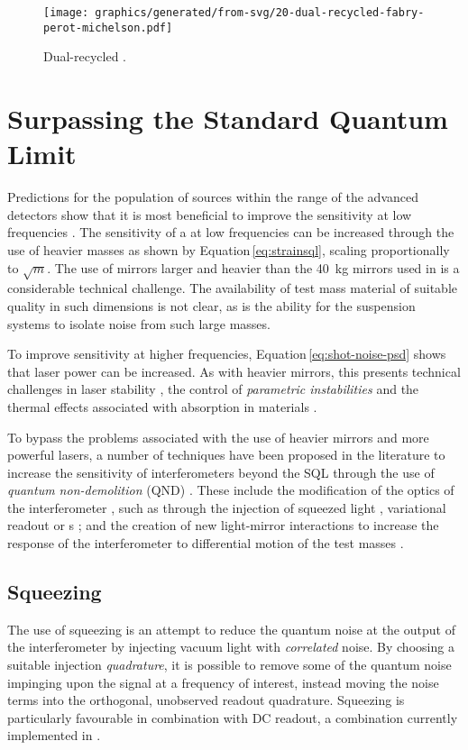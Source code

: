 \begin{figure}
  \centering
  \texttt{[image: graphics/generated/from-svg/20-dual-recycled-fabry-perot-michelson.pdf]}
  \caption[Dual-recycled \FPMI{}]{\label{fig:drfpmi}Dual-recycled \FPMI{}.}
\end{figure}

\section{\label{sec:sub-sql-techniques}Surpassing the Standard Quantum Limit}
Predictions for the population of sources within the range of the advanced detectors show that it is most beneficial to improve the sensitivity at low frequencies \cite{Sathyaprakash2012}. The sensitivity of a \MI{} at low frequencies can be increased through the use of heavier masses as shown by Equation\,\ref{eq:strainsql}, scaling proportionally to $\sqrt{m}$. The use of mirrors larger and heavier than the \SI{40}{\kilo\gram} mirrors used in \ALIGO{} is a considerable technical challenge. The availability of test mass material of suitable quality in such dimensions is not clear, as is the ability for the suspension systems to isolate noise from such large masses.

To improve sensitivity at higher frequencies, Equation\,\ref{eq:shot-noise-psd} shows that laser power can be increased. As with heavier mirrors, this presents technical challenges in laser stability \cite{Hildebrandt2007}, the control of \emph{parametric instabilities} \cite{Evans2015} and the thermal effects associated with absorption in materials \cite{Steinlechner2016}.

To bypass the problems associated with the use of heavier mirrors and more powerful lasers, a number of techniques have been proposed in the literature to increase the sensitivity of interferometers beyond the \gls{SQL} through the use of \emph{quantum non-demolition} (\gls{QND}) \cite{Braginsky1995}. These include the modification of the optics of the interferometer \cite{Kimble2001}, such as through the injection of squeezed light \cite{Caves1981}, variational readout \cite{Vyatchanin1995, Vyatchanin1996} or \SM{}s \cite{Braginsky1990}; and the creation of new light-mirror interactions to increase the response of the interferometer to differential motion of the test masses \cite{Chen2011}.

\subsection{\label{sec:squeezing}Squeezing}
The use of squeezing is an attempt to reduce the quantum noise at the output of the interferometer by injecting vacuum light with \emph{correlated} noise. By choosing a suitable injection \emph{quadrature}, it is possible to remove some of the quantum noise impinging upon the signal at a frequency of interest, instead moving the noise terms into the orthogonal, unobserved readout quadrature. Squeezing is particularly favourable in combination with \gls{DC} readout, a combination currently implemented in \GEO{} \cite{Willke2006, Affeldt2014}.

